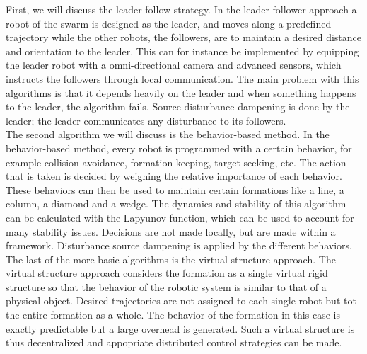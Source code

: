 First, we will discuss the leader-follow strategy. 
In the leader-follower approach a robot of the swarm is designed as the leader, 
and moves along a predefined trajectory while the other robots, the followers, are to maintain a desired distance and orientation to the leader. \cite{Consolini}
This can for instance be implemented by equipping the leader robot with a omni-directional camera and advanced sensors, which instructs the followers through local communication. \cite{Das}
The main problem with this algorithms is that it depends heavily on the leader and when something happens to the leader, the algorithm fails. 
Source disturbance dampening is done by the leader; the leader communicates any disturbance to its followers. \\

The second algorithm we will discuss is the behavior-based method. 
In the behavior-based method, every robot is programmed with a certain behavior, for example collision avoidance, formation keeping, target seeking, etc. 
The action that is taken is decided by weighing the relative importance of each behavior. \cite{consolini}
These behaviors can then be used to maintain certain formations like a line, a column, a diamond and a wedge. \cite{Balch}
The dynamics and stability of this algorithm can be calculated with the Lapyunov function, which can be used to account for many stability issues. \cite{Lawton}
Decisions are not made locally, but are made within a framework.
Disturbance source dampening is applied by the different behaviors. \\

The last of the more basic algorithms is the virtual structure approach. 
The virtual structure approach considers the formation as a single virtual rigid structure so that the behavior of the robotic system is similar to that of a physical object. 
Desired trajectories are not assigned to each single robot but tot the entire formation as a whole. 
The behavior of the formation in this case is exactly predictable but a large overhead is generated. \cite{consolini}
Such a virtual structure is thus decentralized and appopriate distributed control strategies can be made. \cite{Ren}



